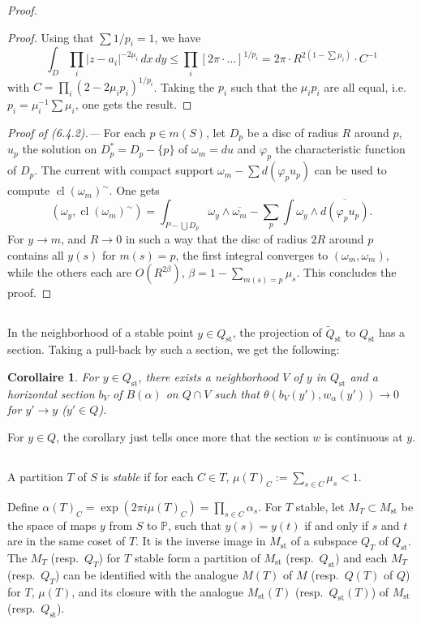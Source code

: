 \documentclass[12pt,a4paper]{article}
\theoremstyle{plain}
\newtheorem{corollary}[theorem]{Corollaire}
\theoremstyle{definition}
\theoremstyle{remark}
\newcommand{\PP}{\mathbb{P}}
\numberwithin{equation}{section}
\providecommand{\PP}{\mathbb{P}}
\providecommand{\cl}{\operatorname{cl}}
\begin{document}
\begin{proof}
\begin{proof}
Using that $\sum 1/p_i = 1$, we have
\[
\int_D \prod_i |z - a_i|^{-2\mu_i} \, dx \, dy \leq \prod_i [2\pi \cdot \ldots]^{1/p_i} = 2\pi \cdot R^{2(1 - \sum \mu_i)} \cdot C^{-1}
\]
with $C = \prod_i (2 - 2\mu_i p_i)^{1/p_i}$. Taking the $p_i$ such that the $\mu_i p_i$ are all equal, i.e.\ $p_i = \mu_i^{-1} \sum \mu_i$, one gets the result.
\end{proof}

\textit{Proof of (6.4.2).---} For each $p \in m(S)$, let $D_p$ be a disc of radius $R$ around $p$, $u_p$ the solution on $D_p^* = D_p - \{p\}$ of $\omega_m = du$ and $\varphi_p$ the characteristic function of $D_p$. The current with compact support $\omega_m - \sum d(\varphi_p u_p)$ can be used to compute $\cl(\omega_m)^\sim$. One gets
\[
(\omega_y, \cl(\omega_m)^\sim) = \int_{P - \bigcup D_p} \omega_y \wedge \overline{\omega_m} - \sum_p \int \omega_y \wedge \overline{d(\varphi_p u_p)}.
\]
For $y \to m$, and $R \to 0$ in such a way that the disc of radius $2R$ around $p$ contains all $y(s)$ for $m(s) = p$, the first integral converges to $(\omega_m, \omega_m)$, while the others each are $O(R^{2\beta})$, $\beta = 1 - \sum_{m(s)=p} \mu_s$. This concludes the proof.
\end{proof}

\subsection{}
In the neighborhood of a stable point $y \in Q_{\mathrm{st}}$, the projection of $\widetilde{Q}_{\mathrm{st}}$ to $Q_{\mathrm{st}}$ has a section. Taking a pull-back by such a section, we get the following:

\begin{corollary}\label{cor:6.8}
For $y \in Q_{\mathrm{st}}$, there exists a neighborhood $V$ of $y$ in $Q_{\mathrm{st}}$ and a horizontal section $b_V$ of $B(\alpha)$ on $Q \cap V$ such that $\theta(b_V(y'), w_\alpha(y')) \to 0$ for $y' \to y$ ($y' \in Q$).
\end{corollary}

For $y \in Q$, the corollary just tells once more that the section $w$ is continuous at $y$.

\subsection{}
A partition $T$ of $S$ is \emph{stable} if for each $C \in T$, $\mu(T)_C := \sum_{s \in C} \mu_s < 1$.

Define $\alpha(T)_C = \exp(2\pi i \mu(T)_C) = \prod_{s \in C} \alpha_s$. For $T$ stable, let $M_T \subset M_{\mathrm{st}}$ be the space of maps $y$ from $S$ to $\PP$, such that $y(s) = y(t)$ if and only if $s$ and $t$ are in the same coset of $T$. It is the inverse image in $M_{\mathrm{st}}$ of a subspace $Q_T$ of $Q_{\mathrm{st}}$. The $M_T$ (resp.\ $Q_T$) for $T$ stable form a partition of $M_{\mathrm{st}}$ (resp.\ $Q_{\mathrm{st}}$) and each $M_T$ (resp.\ $Q_T$) can be identified with the analogue $M(T)$ of $M$ (resp.\ $Q(T)$ of $Q$) for $T$, $\mu(T)$, and its closure with the analogue $M_{\mathrm{st}}(T)$ (resp.\ $Q_{\mathrm{st}}(T)$) of $M_{\mathrm{st}}$ (resp.\ $Q_{\mathrm{st}}$).
\end{document}
